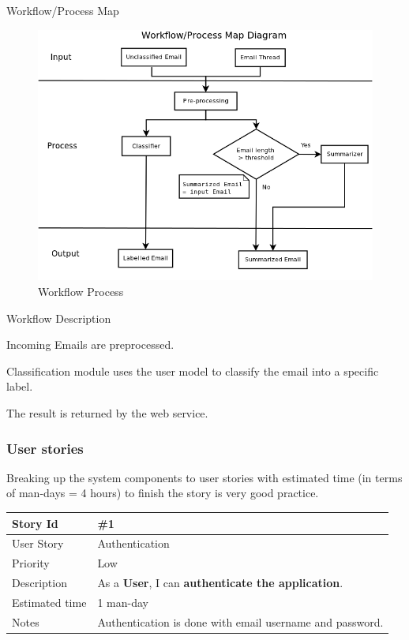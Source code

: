 \begin{my_enumerate}
  \item Workflow/Process Map 
	
\begin{figure}[H]
  \centering
\includegraphics[scale=0.5]{workflow_process_map.png}
  \caption[Workflow Process] {Workflow Process}
\end{figure}

  \item Workflow Description
  \begin{my_itemize}
    \item Incoming Emails are preprocessed.
    \item Classification module uses the user model to classify the email into a specific label.
    \item The result is returned by the web service.
  \end{my_itemize}
\end{my_enumerate}

\subsubsection{User stories}
Breaking up the system components to user stories with estimated time (in terms
of man-days = 4 hours) to finish the story is very good practice.
\\

\begin{tabular}{|p{3cm}|p{10cm}|}
\hline
\cellcolor[gray]{0.9} Story Id & \#1 \\ \hline
\cellcolor[gray]{0.9} User Story & Authentication \\ \hline
\cellcolor[gray]{0.9} Priority & Low \\ \hline
\cellcolor[gray]{0.9} Description & 
      As a \textbf{User}, I can \textbf{authenticate the application}. \\ \hline
\cellcolor[gray]{0.9} Estimated time & 1 man-day \\ \hline
\cellcolor[gray]{0.9} Notes & 
      Authentication is done with email username and password. \\ \hline
\end{tabular}

